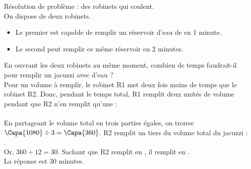  \begin{corrige}
   Résolution de problème : des robinets qui coulent. \\
   On dispose de deux robinets.
   \begin{itemize}
      \item Le premier est capable de remplir un réservoir d’eau de  en 1 minute.
      \item Le second peut remplir ce même réservoir en 2 minutes.
   \end{itemize}
   En ouvrant les deux robinets au même moment, combien de temps faudrait-il pour remplir un jacuzzi avec  d’eau ? \\

   {\red
    Pour un volume à remplir, le robinet R1 met deux fois moins de temps que le robinet R2. Donc, pendant le temps total, R1 remplit deux \og unités de volume \fg{} pendant que R2 n'en remplit qu’une : \\ [1mm]
     \\
    En partageant le volume total en trois parties égales, on trouve $\Capa{1080}\div3 =\Capa{360}$.
    R2 remplit un tiers du volume total du jacuzzi : . \\
    Or, $360\div12 =30$. Sachant que R2 remplit  en , il remplit  en . \\
    La réponse est 30 minutes.
    }
 \end{corrige}